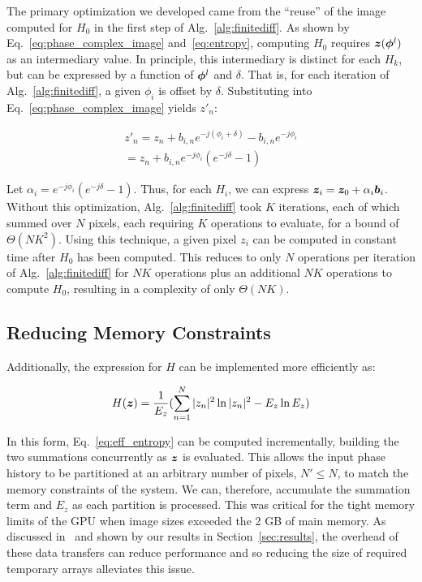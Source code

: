 The primary optimization we developed came from the ``reuse'' of the image
computed for $H_0$ in the first step of Alg.~\ref{alg:finitediff}. As shown by
Eq.~\ref{eq:phase_complex_image} and~\ref{eq:entropy}, computing $H_0$ requires
$\bm{z}(\bm{\phi}^l)$ as an intermediary value. In principle, this intermediary is
distinct for each $H_k$, but can be expressed by a function of $\bm{\phi}^l$ and
$\delta$. That is, for each iteration of Alg.~\ref{alg:finitediff}, a given
$\phi_{i}$ is offset by $\delta$.  Substituting into
Eq.~\ref{eq:phase_complex_image} yields $z'_n$:

\begin{equation}\label{eq:z_prime}
  \begin{split}
    z'_n = z_n + b_{i,n}e^{-j(\phi_{i} + \delta)} - b_{i,n}e^{-j\phi_{i}} \\ =
    z_n + b_{i,n}e^{-j\phi_{i}}(e^{-j\delta} - 1)
  \end{split}
\end{equation}

Let $\alpha_{i} = e^{-j\phi_{i}}(e^{-j\delta} - 1)$. Thus, for each $H_i$, we
can express $\bm{z}_{i} = \bm{z}_{0} + \alpha_{i} \bm{b}_i$. Without this
optimization, Alg.~\ref{alg:finitediff} took $K$ iterations, each of which
summed over $N$ pixels, each requiring $K$ operations to evaluate, for a bound
of $\Theta(NK^2)$. Using this technique, a given pixel $z_i$ can be computed in
constant time after $H_0$ has been computed. This reduces to only $N$ operations
per iteration of Alg.~\ref{alg:finitediff} for $NK$ operations plus an
additional $NK$ operations to compute $H_0$, resulting in a complexity of only
$\Theta(NK)$.

\subsection{Reducing Memory Constraints}

Additionally, the expression for $H$ can be implemented more efficiently as:

\begin{equation}\label{eq:eff_entropy}
  H(\bm{z}) = \frac{1}{E_z}(\sum_{n=1}^{N} |z_n|^2 \ln |z_n|^2 - E_z \ln E_z)
\end{equation}

In this form, Eq.~\ref{eq:eff_entropy} can be computed incrementally, building the
two summations concurrently as $\bm{z}$ is evaluated. This allows the input phase
history to be partitioned at an arbitrary number of pixels, $N' \le N$, to match
the memory constraints of the system. We can, therefore, accumulate the summation
term and $E_z$ as each partition is processed. This was critical for the tight memory
limits of the GPU when image sizes exceeded the 2 GB of main memory. As
discussed in~\cite{gpu-sar} and shown by our results in
Section~\ref{sec:results}, the overhead of these data transfers can reduce
performance and so reducing the size of required temporary arrays alleviates
this issue.
